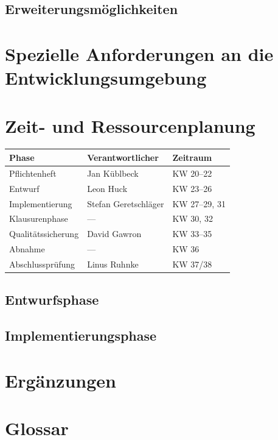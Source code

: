 \documentclass[parskip=full]{scrartcl}
\begin{document}
\subsection{Erweiterungsmöglichkeiten}

\section{Spezielle Anforderungen an die Entwicklungsumgebung}

\section{Zeit- und Ressourcenplanung}

\begin{tabular}{| l | l | l |}
	\hline
	\textbf{Phase} & \textbf{Verantwortlicher} & \textbf{Zeitraum} \\ \hline
	Pflichtenheft & Jan Küblbeck & KW 20–22 \\
	Entwurf & Leon Huck & KW 23–26 \\
	Implementierung & Stefan Geretschläger & KW 27–29, 31 \\
	Klausurenphase & — & KW 30, 32 \\
	Qualitätssicherung & David Gawron & KW 33–35 \\
	Abnahme & — & KW 36 \\
	Abschlussprüfung & Linus Ruhnke & KW 37/38 \\
	\hline
\end{tabular}

\subsection{Entwurfsphase}

\subsection{Implementierungsphase}

\section{Ergänzungen}

\section{Glossar}

\renewcommand*{\glossarysection}[2][]{}	%
\printnoidxglossaries				%
\end{document}
